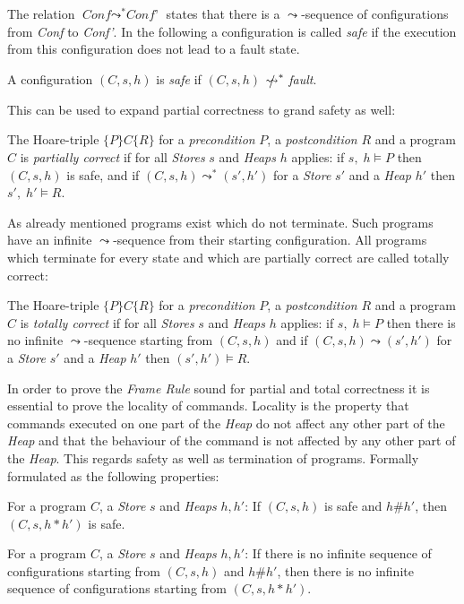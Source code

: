 	The relation $\textit{Conf} \leadsto^\ast \textit{Conf'}$ states that
	there is a $\leadsto$-sequence of configurations from \textit{Conf} to
	\textit{Conf'}.
	In the following a configuration is called \emph{safe} if the execution from
	this configuration does not lead to a fault state.
	\begin{mydef}[Safety]
		A configuration $(C,s,h)$ is \emph{safe} if $(C,s,h)$ $\slashed{\leadsto}^\ast$ \textit{fault}.
	\end{mydef}
	This can be used to expand partial correctness to grand safety as well:
	\begin{mydef}
		The Hoare-triple $\{P\}C\{R\}$ for a \emph{precondition} $P$, a
		\emph{postcondition} $R$ and a program $C$ is \emph{partially correct}
		if for all \emph{Stores} $s$ and \emph{Heaps} $h$ applies:
		if $s,\;h\models P$ then
			$(C,s,h)$ is safe, and if $(C,s,h)\leadsto^\ast (s',h')$ for a
			\emph{Store} $s'$ and a \emph{Heap} $h'$ then $s',\;h'\models R$.
	\end{mydef}
	As already mentioned programs exist which do not terminate. Such programs
	have an infinite $\leadsto$-sequence from their starting configuration.
	All programs which terminate for every state and which are partially correct
	are called totally correct:
	\begin{mydef}
		The Hoare-triple $\{P\}C\{R\}$ for a \emph{precondition} $P$, a
		\emph{postcondition} $R$ and a program $C$ is \emph{totally correct}
		if for all \emph{Stores} $s$ and \emph{Heaps} $h$ applies:
		if $s,\;h\models P$ then there is no infinite $\leadsto$-sequence
		starting from $(C,s,h)$ and if $(C,s,h) \leadsto (s',h')$ for
		a \emph{Store} $s'$ and a \emph{Heap} $h'$ then $(s',h')\models R$.
	\end{mydef}
	In order to prove the \emph{Frame Rule} sound for partial and total
	correctness it is essential to prove the locality of commands. Locality
	is the property that commands executed on one part of the \emph{Heap}
	do not affect any other part of the \emph{Heap} and that the behaviour of
	the command is not affected by any other part of the \emph{Heap}. This
	regards safety as well as termination of programs. Formally formulated
	as the following properties:
	\begin{myprop}
		For a program $C$, a \emph{Store} $s$ and \emph{Heaps} $h,h'$:
		If $(C,s,h)$ is safe and $h\#h'$, then $(C,s,h\ast h')$ is safe.
	\end{myprop}
	\begin{myprop}
		For a program $C$, a \emph{Store} $s$ and \emph{Heaps} $h,h'$:
		If there is no infinite sequence of configurations starting from
		$(C,s,h)$ and $h\#h'$, then there is no infinite sequence of
		configurations starting from $(C,s,h\ast h')$.
	\end{myprop}
